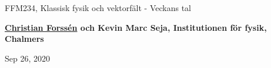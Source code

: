 \documentclass[%
oneside,                 %
final,                   %
10pt]{article}
\begin{document}

\newcommand{\exercisesection}[1]{\subsection*{#1}}







\thispagestyle{empty}

\begin{center}
{\LARGE\bf
\begin{spacing}{1.25}
FFM234, Klassisk fysik och vektorfält - Veckans tal
\end{spacing}
}
\end{center}


\begin{center}
{\bf \href{{http://fy.chalmers.se/subatom/tsp/}}{Christian Forssén} och Kevin Marc Seja, Institutionen för  fysik, Chalmers${}^{}$} \\ [0mm]
\end{center}

\begin{center}
\end{center}
    

\begin{center}
Sep 26, 2020
\end{center}

\vspace{1cm}
\end{document}
